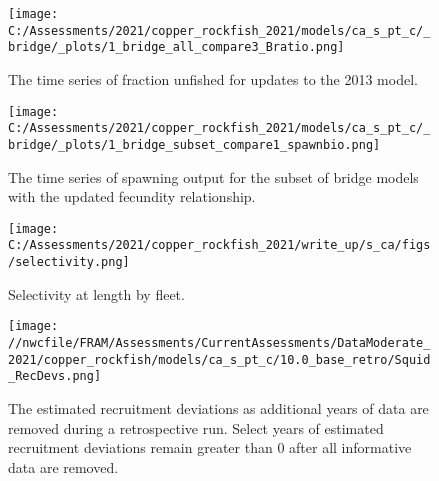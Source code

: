 \documentclass[11pt,
  english,
  a4paper,
]{article}
\begin{document}
\tagmcend\tagstructend


\begin{figure}
\centering
\texttt{[image: C:/Assessments/2021/copper\_rockfish\_2021/models/ca\_s\_pt\_c/\_bridge/\_plots/1\_bridge\_all\_compare3\_Bratio.png]}
\caption{The time series of fraction unfished for updates to the 2013 model.\label{fig:bridge-depl}}
\end{figure}

\tagmcend\tagstructend


\begin{figure}
\centering
\texttt{[image: C:/Assessments/2021/copper\_rockfish\_2021/models/ca\_s\_pt\_c/\_bridge/\_plots/1\_bridge\_subset\_compare1\_spawnbio.png]}
\caption{The time series of spawning output for the subset of bridge models with the updated fecundity relationship.\label{fig:bridge-ssb-2}}
\end{figure}

\tagmcend\tagstructend


\begin{figure}
\centering
\texttt{[image: C:/Assessments/2021/copper\_rockfish\_2021/write\_up/s\_ca/figs/selectivity.png]}
\caption{Selectivity at length by fleet.\label{fig:selex}}
\end{figure}

\tagmcend\tagstructend


\begin{figure}
\centering
\texttt{[image: //nwcfile/FRAM/Assessments/CurrentAssessments/DataModerate\_2021/copper\_rockfish/models/ca\_s\_pt\_c/10.0\_base\_retro/Squid\_RecDevs.png]}
\caption{The estimated recruitment deviations as additional years of data are removed during a retrospective run. Select years of estimated recruitment deviations remain greater than 0 after all informative data are removed.\label{fig:squid-rec}}
\end{figure}
\end{document}
